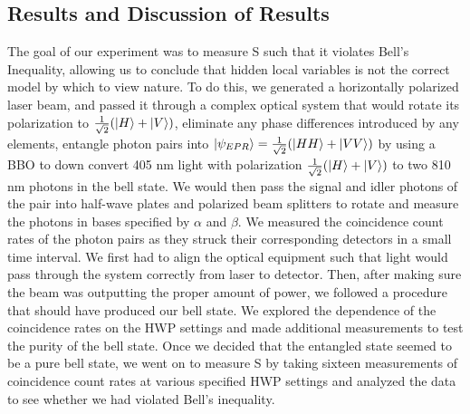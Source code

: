 \documentclass{article}
\begin{document}
    \subsection{Results and Discussion of Results}
    The goal of our experiment was to measure S such that it violates Bell's Inequality, allowing us to conclude that hidden local variables is not the correct model by which to view nature. To do this, we generated a horizontally polarized laser beam, and passed it through a complex optical system that would rotate its polarization to $\frac{1}{\sqrt{2}}(\left\vert{H}\right\rangle + \left\vert{V}\right\rangle)$, eliminate any phase differences introduced by any elements, entangle photon pairs into $\left\vert{\psi_{EPR}}\right\rangle = \frac{1}{\sqrt{2}}(\left\vert{HH}\right\rangle + \left\vert{VV}\right\rangle)$ by using a BBO to down convert 405 nm light with polarization  $\frac{1}{\sqrt{2}}(\left\vert{H}\right\rangle + \left\vert{V}\right\rangle)$ to two 810 nm photons in the bell state. We would then pass the signal and idler photons of the pair into half-wave plates and polarized beam splitters to rotate and measure the photons in bases specified by $\alpha$ and $\beta$. We measured the coincidence count rates of the photon pairs as they struck their corresponding detectors in a small time interval. We first had to align the optical equipment such that light would pass through the system correctly from laser to detector. Then, after making sure the beam was outputting the proper amount of power, we followed a procedure that should have produced our bell state. We explored the dependence of the coincidence rates on the HWP settings and made additional measurements to test the purity of the bell state. Once we decided that the entangled state seemed to be a pure bell state, we went on to measure S by taking sixteen measurements of coincidence count rates at various specified HWP settings and analyzed the data to see whether we had violated Bell's inequality.
\end{document}
